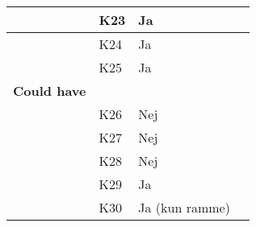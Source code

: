 \documentclass[class=article, crop=false]{standalone}
\begin{document}
\begin{table}[H]
\begin{tabularx}{\textwidth}{|l|l|l|X|}
            & K23      & Ja                 &                                                                                                                                                                                                    \\ \hline
            & K24      & Ja                 &                                                                                                                                                                                                    \\ \hline
            & K25      & Ja                 &                                                                                                                                                                                                    \\ \hline
            \textbf{Could have}      &          &                    &                                                                                                                                                                                                    \\ \hline
            & K26      & Nej                &                                                                                                                                                                                                    \\ \hline
            & K27      & Nej                &                                                                                                                                                                                                    \\ \hline
            & K28      & Nej                &                                                                                                                                                                                                    \\ \hline
            & K29      & Ja                 &                                                                                                                                                                                                    \\ \hline
            & K30      & Ja (kun ramme)     &                                                                                                                                                                                                    \\ \hline

\end{tabularx}
\end{table}
\end{document}
